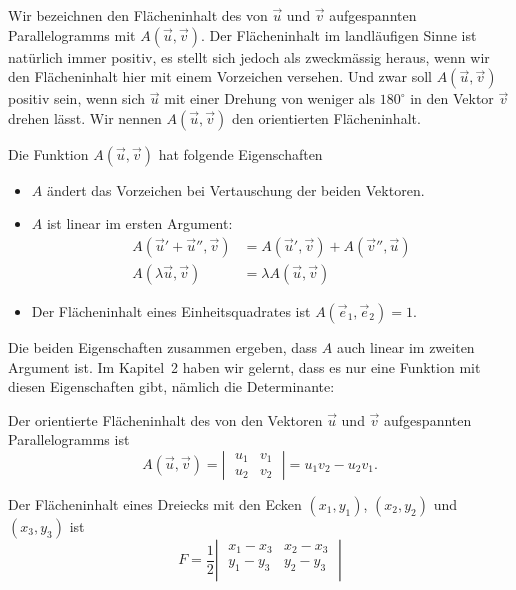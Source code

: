 Wir bezeichnen den Flächeninhalt des von $\vec u$ und $\vec v$ aufgespannten
Parallelogramms mit $A(\vec u,\vec v)$.
Der Flächeninhalt im landläufigen
Sinne ist natürlich immer positiv, es stellt sich jedoch als
zweckmässig heraus, wenn wir den Flächeninhalt hier mit einem
Vorzeichen versehen.
Und zwar soll $A(\vec u,\vec v)$ positiv sein, wenn
sich $\vec u$ mit einer Drehung von weniger als $180^\circ$ in den Vektor
$\vec v$ drehen lässt.
Wir nennen $A(\vec u, \vec v)$ den orientierten
Flächeninhalt.

Die Funktion $A(\vec u,\vec v)$ hat folgende Eigenschaften
\begin{itemize}
\item $A$ ändert das Vorzeichen bei Vertauschung der beiden Vektoren.
\item $A$ ist linear im ersten Argument:
\begin{align*}
A(\vec u'+\vec u'',\vec v)&=A(\vec u',\vec v)+A(\vec v'',\vec u)
\\
A(\lambda \vec u,\vec v)&=\lambda A(\vec u,\vec v)
\end{align*}
\item Der Flächeninhalt eines Einheitsquadrates ist $A(\vec e_1,\vec e_2)=1$.
\end{itemize}
Die beiden Eigenschaften zusammen ergeben, dass $A$ auch linear im
zweiten Argument ist.
Im Kapitel~2 haben wir gelernt, dass es nur eine
Funktion mit diesen Eigenschaften gibt, nämlich die Determinante:
\begin{satz}
Der orientierte Flächeninhalt des von den Vektoren $\vec u$ und $\vec v$
aufgespannten Parallelogramms ist
\[
A(\vec u,\vec v)=\left|\;\begin{matrix}u_1&v_1\\u_2&v_2\end{matrix}\;\right|
=u_1v_2-u_2v_1
.
\]
\end{satz}
\begin{satz}
Der Flächeninhalt eines Dreiecks mit den Ecken $(x_1,y_1)$, $(x_2,y_2)$ und
$(x_3,y_3)$ ist
\[
F=
\frac12\left|\;
\begin{matrix}
x_1-x_3&x_2-x_3\\
y_1-y_3&y_2-y_3\\
\end{matrix}
\;\right|
\]
\end{satz}

